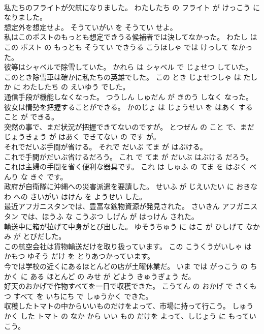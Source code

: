 \documentclass[8pt]{extreport}
\begin{document}
\begin{CJK}{UTF8}{min}
\\	私たちのフライトが欠航になりました。	わたしたち の フライト が けっこう に なりました。	
\\	想定外を想定せよ。	そうていがい を そうてい せよ。	
\\	私はこのポストのもっとも想定できうる候補者では決してなかった。	わたし は この ポスト の もっとも そうてい できうる こうほしゃ では けっして なかった。	
\\	彼等はシャベルで除雪していた。	かれら は シャベル で じょせつ していた。	
\\	このとき除雪車は確かに私たちの英雄でした。	この とき じょせつしゃ は たしか に わたしたち の えいゆう でした。	
\\	通信手段が機能しなくなった。	つうしん しゅだん が きのう しなく なった。	
\\	彼女は情勢を把握することができる。	かのじょ は じょうせい を はあく する こと が できる。	
\\	突然の事で、まだ状況が把握できてないのですが。	とつぜん の こと で、まだ じょうきょう が はあく できてない の です が。	
\\	それでだいぶ手間が省ける。	それで だいぶ てま が はぶける。	
\\	これで手間がだいぶ省けるだろう。	これ で てま が だいぶ はぶける だろう。	
\\	これは主婦の手間を省く便利な器具です。	これ は しゅふ の てま を はぶく べんり な きぐ です。	
\\	政府が自衛隊に沖縄への災害派遣を要請した。	せいふ が じえいたい に おきなわ への さいがい はけん を ようせい した。	
\\	最近アフガニスタンでは、豊富な鉱物資源が発見された。	さいきん アフガニスタン では、ほうふ な こうぶつ しげん が はっけん された。	
\\	輸送中に箱が拉げて中身がとび出した。	ゆそうちゅう に はこ が ひしげて なかみ が とびだした。	
\\	この航空会社は貨物輸送だけを取り扱っています。	この こうくうがいしゃ は かもつ ゆそう だけ を とりあつかっています。	
\\	今では学校の近くにあるほとんどの店が土曜休業だ。	いま では がっこう の ちかく に ある ほとんど の みせ が どよう きゅうぎょう だ。	
\\	好天のおかげで作物すべてを一日で収穫できた。	こうてん の おかげ で さくもつ すべて を いちにち で しゅうかく できた。	
\\	収穫したトマトの中からいいものだけをよって、市場に持って行こう。	しゅうかく した トマト の なか から いい もの だけを よって、しじょう に もっていこう。	

\end{CJK}
\end{document}
